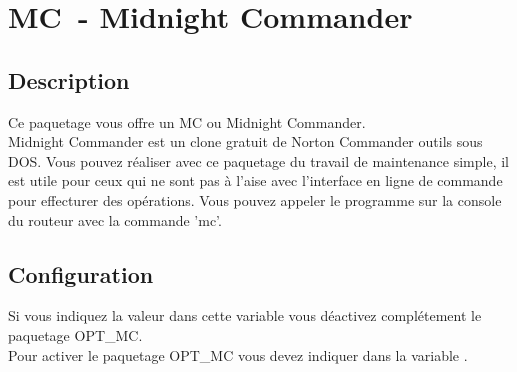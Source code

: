 {
\section {MC~- Midnight Commander}
}

\subsection {Description}

  Ce paquetage vous offre un MC ou Midnight Commander.\\
  Midnight Commander est un clone gratuit de Norton Commander outils sous DOS.
  Vous pouvez réaliser avec ce paquetage du travail de maintenance simple, il
  est utile pour ceux qui ne sont pas à l'aise avec l'interface en ligne de
  commande pour effecturer des opérations. Vous pouvez appeler le programme
  sur la console du routeur avec la commande 'mc'.

\subsection{Configuration}

\begin{description}


  Si vous indiquez la valeur  dans cette variable vous déactivez
  complétement le paquetage OPT\_MC.\\
  Pour activer le paquetage OPT\_MC vous devez indiquer  dans la
  variable .

\end{description}
